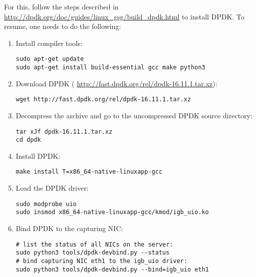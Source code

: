For this, follow the steps described in \url{http://dpdk.org/doc/guides/linux_gsg/build_dpdk.html} to install DPDK.
To resume, one needs to do the following:
\begin{enumerate}
        \item Install compiler tools:

\begin{lstlisting}[style=BASH]
sudo apt-get update
sudo apt-get install build-essential gcc make python3
\end{lstlisting}

    \item Download DPDK (
    \url{http://fast.dpdk.org/rel/dpdk-16.11.1.tar.xz}):
    
\begin{lstlisting}[style=BASH]
wget http://fast.dpdk.org/rel/dpdk-16.11.1.tar.xz
\end{lstlisting}
    
    \item Decompress the archive and go to the uncompressed DPDK source directory:
    
\begin{lstlisting}[style=BASH]
tar xJf dpdk-16.11.1.tar.xz
cd dpdk
\end{lstlisting}
    
    \item Install DPDK:
    
\begin{lstlisting}[style=BASH]
make install T=x86_64-native-linuxapp-gcc
\end{lstlisting}
     
    \item Load the DPDK driver:
    
\begin{lstlisting}[style=BASH]
sudo modprobe uio
sudo insmod x86_64-native-linuxapp-gcc/kmod/igb_uio.ko
\end{lstlisting}

    \item Bind DPDK to the capturing NIC:
    
\begin{lstlisting}[style=BASH]
# list the status of all NICs on the server:
sudo python3 tools/dpdk-devbind.py --status
# bind capturing NIC eth1 to the igb_uio driver:
sudo python3 tools/dpdk-devbind.py --bind=igb_uio eth1
\end{lstlisting}

\end{enumerate}    

